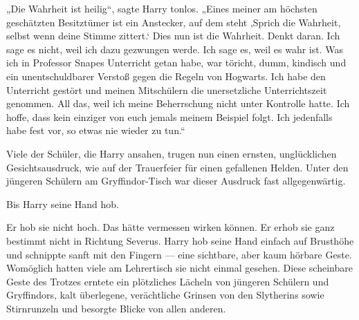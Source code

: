 „Die Wahrheit ist heilig“, sagte Harry tonlos.
„Eines meiner am höchsten geschätzten Besitztümer ist ein Anstecker, auf dem steht ‚Sprich die Wahrheit, selbst wenn deine Stimme zittert.‘ Dies nun ist die Wahrheit. Denkt daran. Ich sage es nicht, weil ich dazu gezwungen werde. Ich sage es, weil es wahr ist. Was ich in Professor Snapes Unterricht getan habe, war töricht, dumm, kindisch und ein unentschuldbarer Verstoß gegen die Regeln von Hogwarts. Ich habe den Unterricht gestört und meinen Mitschülern die unersetzliche Unterrichtszeit genommen. All das, weil ich meine Beherrschung nicht unter Kontrolle hatte. Ich hoffe, dass kein einziger von euch jemals meinem Beispiel folgt. Ich jedenfalls habe fest vor, so etwas nie wieder zu tun.“

Viele der Schüler, die Harry ansahen, trugen nun einen ernsten, unglücklichen Gesichtsausdruck, wie auf der Trauerfeier für einen gefallenen Helden. Unter den jüngeren Schülern am Gryffindor-Tisch war dieser Ausdruck fast allgegenwärtig.

Bis Harry seine Hand hob.

Er hob sie nicht hoch. Das hätte vermessen wirken können. Er erhob sie ganz bestimmt nicht in Richtung Severus. Harry hob seine Hand einfach auf Brusthöhe und schnippte sanft mit den Fingern — eine sichtbare, aber kaum hörbare Geste. Womöglich hatten viele am Lehrertisch sie nicht einmal gesehen.
Diese scheinbare Geste des Trotzes erntete ein plötzliches Lächeln von jüngeren Schülern und Gryffindors, kalt überlegene, verächtliche Grinsen von den Slytherins sowie Stirnrunzeln und besorgte Blicke von allen anderen.

